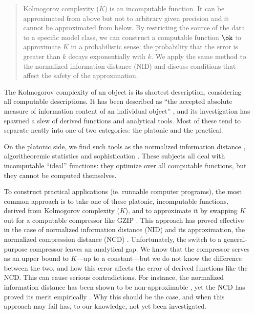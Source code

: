 
\begin{abstract}
\noindent Kolmogorov complexity ($K$) is an incomputable function. It can be approximated from above but not to arbitrary given precision and it cannot be approximated from below. By restricting the source of the data to a specific model class, we can construct a computable function $\ok$ to approximate $K$ in a probabilistic sense: the probability that the error is greater than $k$ decays exponentially with $k$. We apply the same method to the normalized information distance (NID) and discuss conditions that affect the safety of the approximation.
\end{abstract}

\noindent The Kolmogorov complexity of an object is its shortest description, considering all computable descriptions. It has been described as ``the accepted absolute measure of information content of an individual object'' \cite{DBLP:journals/tit/GacsTV01}, and its investigation has spawned a slew of derived functions and analytical tools. Most of these tend to separate neatly into one of two categories: the platonic and the practical. 

On the platonic side, we find such tools as the normalized information distance \cite{DBLP:journals/tit/LiCLMV04}, algoritheoremic statistics \cite{DBLP:journals/tit/GacsTV01} and sophistication \cite{DBLP:journals/tit/Vitanyi06,adriaans2012facticity}. These subjects all deal with incomputable ``ideal'' functions: they optimize over all computable functions, but they cannot be computed themselves.

To construct practical applications (ie. runnable computer programs), the most common approach is to take one of these platonic, incomputable functions, derived from Kolmogorov complexity ($K$), and to approximate it by swapping $K$ out for a computable compressor like GZIP \cite{gailly1991gzip}. This approach has proved effective in the case of normalized information distance (NID) \cite{DBLP:journals/tit/LiCLMV04} and its approximation, the normalized compression distance (NCD) \cite{DBLP:journals/tit/CilibrasiV05}. Unfortunately, the switch to a general-purpose compressor leaves an analytical gap. We know that the compressor serves as an upper bound to $K$---up to a constant---but we do not know the difference between the two, and how this error affects the error of derived functions like the NCD. This can cause serious contradictions. For instance, the normalized information distance has been shown to be non-approximable \cite{DBLP:journals/jcss/TerwijnTV11}, yet the NCD has proved its merit empirically \cite{DBLP:journals/tit/CilibrasiV05}. Why this should be the case, and when this approach may fail has, to our knowledge, not yet been investigated.

